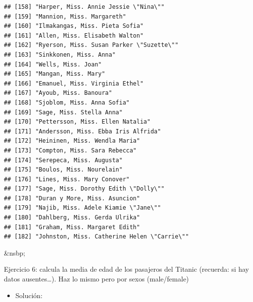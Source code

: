 \documentclass[11pt,]{book}
\newenvironment{Shaded}{\begin{snugshade}}{\end{snugshade}}
\newcommand{\DataTypeTok}[1]{\textcolor[rgb]{0.27,0.27,0.27}{#1}}
\newcommand{\KeywordTok}[1]{\textcolor[rgb]{0.27,0.27,0.27}{\textbf{#1}}}
\newcommand{\NormalTok}[1]{#1}
\newcommand{\OperatorTok}[1]{\textcolor[rgb]{0.43,0.43,0.43}{\textbf{#1}}}
\newcommand{\OtherTok}[1]{\textcolor[rgb]{0.37,0.37,0.37}{#1}}
\providecommand{\tightlist}{%
  \setlength{\itemsep}{0pt}\setlength{\parskip}{0pt}}
\begin{document}
\begin{verbatim}
## [158] "Harper, Miss. Annie Jessie \"Nina\""                                  
## [159] "Mannion, Miss. Margareth"                                             
## [160] "Ilmakangas, Miss. Pieta Sofia"                                        
## [161] "Allen, Miss. Elisabeth Walton"                                        
## [162] "Ryerson, Miss. Susan Parker \"Suzette\""                              
## [163] "Sinkkonen, Miss. Anna"                                                
## [164] "Wells, Miss. Joan"                                                    
## [165] "Mangan, Miss. Mary"                                                   
## [166] "Emanuel, Miss. Virginia Ethel"                                        
## [167] "Ayoub, Miss. Banoura"                                                 
## [168] "Sjoblom, Miss. Anna Sofia"                                            
## [169] "Sage, Miss. Stella Anna"                                              
## [170] "Pettersson, Miss. Ellen Natalia"                                      
## [171] "Andersson, Miss. Ebba Iris Alfrida"                                   
## [172] "Heininen, Miss. Wendla Maria"                                         
## [173] "Compton, Miss. Sara Rebecca"                                          
## [174] "Serepeca, Miss. Augusta"                                              
## [175] "Boulos, Miss. Nourelain"                                              
## [176] "Lines, Miss. Mary Conover"                                            
## [177] "Sage, Miss. Dorothy Edith \"Dolly\""                                  
## [178] "Duran y More, Miss. Asuncion"                                         
## [179] "Najib, Miss. Adele Kiamie \"Jane\""                                   
## [180] "Dahlberg, Miss. Gerda Ulrika"                                         
## [181] "Graham, Miss. Margaret Edith"                                         
## [182] "Johnston, Miss. Catherine Helen \"Carrie\""
\end{verbatim}

\&nsbp;

Ejercicio 6: calcula la media de edad de los pasajeros del Titanic (recuerda: si hay datos ausentes\ldots{}). Haz lo mismo pero por sexos (male/female)

\begin{itemize}
\tightlist
\item
  Solución:
\end{itemize}

\begin{Shaded}
\end{Shaded}
\end{document}
